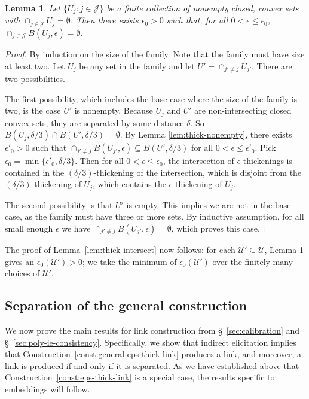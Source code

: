 \documentclass[11pt]{article}
\newcommand{\U}{\mathcal{U}}
\newtheorem{lemma}{Lemma}
\begin{document}
\begin{lemma} \label{lem:thick-empty}
  Let $\{U_j : j \in \mathcal{J}\}$ be a finite collection of nonempty closed, convex sets with $\cap_{j\in\mathcal{J}} U_j = \emptyset$.
  Then there exists  $\epsilon_0 > 0$ such that, for all $0 < \epsilon \leq \epsilon_0$, $\cap_{j\in\mathcal{J}} B(U_j,\epsilon) = \emptyset$.
\end{lemma}
\begin{proof}
  By induction on the size of the family.
  Note that the family must have size at least two.
  Let $U_j$ be any set in the family and let $U' = \cap_{j' \neq j} U_{j'}$.
  There are two possibilities.

  The first possibility, which includes the base case where the size of the family is two, is the case $U'$ is nonempty.
  Because $U_j$ and $U'$ are non-intersecting closed convex sets, they are separated by some distance $\delta$.
  So $B(U_j, \delta/3) \cap B(U', \delta/3) = \emptyset$.
  By Lemma \ref{lem:thick-nonempty}, there exists $\epsilon'_0 > 0$ such that $\cap_{j'\neq j} B(U_{j'},\epsilon) \subseteq B(U', \delta/3)$ for all $0 < \epsilon \leq \epsilon'_0$.
  Pick $\epsilon_0 = \min\{\epsilon'_0,\delta/3\}$.
  Then for all $0 < \epsilon \leq \epsilon_0$, the intersection of $\epsilon$-thickenings is contained in the $(\delta/3)$-thickening of the intersection, which is disjoint from the $(\delta/3)$-thickening of $U_j$, which contains the $\epsilon$-thickening of $U_j$.

  The second possibility is that $U'$ is empty.
  This implies we are not in the base case, as the family must have three or more sets.
  By inductive assumption, for all small enough $\epsilon$ we have $\cap_{j' \neq j} B(U_{j'},\epsilon) = \emptyset$, which proves this case.
\end{proof}

The proof of Lemma~\ref{lem:thick-intersect} now follows: for each $\U'\subseteq\U$, Lemma \ref{lem:thick-empty} gives an $\epsilon_0(\U') > 0$; we take the minimum of $\epsilon_0(\U')$ over the finitely many choices of $\U'$.

\subsection{Separation of the general construction}

We now prove the main results for link construction from \S~\ref{sec:calibration} and \S~\ref{sec:poly-ie-consistency}.
Specifically, we show that indirect elicitation implies that Construction~\ref{const:general-eps-thick-link} produces a link, and moreover, a link is produced if and only if it is separated.
As we have established above that Construction~\ref{const:eps-thick-link} is a special case, the results specific to embeddings will follow.
\end{document}

